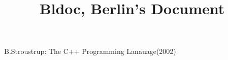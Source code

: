 \documentclass[a4paper,11pt,oneside,openany]{book}
\title{\huge \bfseries Bldoc, Berlin's Document}
\begin{document}
\begin{CJK*}{GBK}{song}

\maketitle

\clearpage      %
{}    %

\tableofcontents

\setlength{\parskip}{1ex plus 0.5ex minus 0.2ex}    %


%
%
%
%
%

%
%
%


\clearpage      %
{}    %

\begin{thebibliography}{99}
 B.Stroustrup: The C++ Programming Lanauage(2002)
\end{thebibliography}

\clearpage      %
{}    %

\printindex

\end{CJK*}
\end{document}
